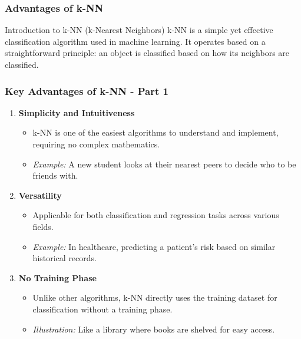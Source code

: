 \documentclass[aspectratio=169]{beamer}
\begin{document}
\begin{frame}[fragile]
    \frametitle{Advantages of k-NN}
    \begin{block}{Introduction to k-NN (k-Nearest Neighbors)}
        k-NN is a simple yet effective classification algorithm used in machine learning. It operates based on a straightforward principle: an object is classified based on how its neighbors are classified.
    \end{block}
\end{frame}

\begin{frame}[fragile]
    \frametitle{Key Advantages of k-NN - Part 1}
    \begin{enumerate}
        \item \textbf{Simplicity and Intuitiveness}
            \begin{itemize}
                \item k-NN is one of the easiest algorithms to understand and implement, requiring no complex mathematics.
                \item \textit{Example:} A new student looks at their nearest peers to decide who to be friends with.
            \end{itemize}
        
        \item \textbf{Versatility}
            \begin{itemize}
                \item Applicable for both classification and regression tasks across various fields.
                \item \textit{Example:} In healthcare, predicting a patient’s risk based on similar historical records.
            \end{itemize}
        
        \item \textbf{No Training Phase}
            \begin{itemize}
                \item Unlike other algorithms, k-NN directly uses the training dataset for classification without a training phase.
                \item \textit{Illustration:} Like a library where books are shelved for easy access.
            \end{itemize}
    \end{enumerate}
\end{frame}
\end{document}
